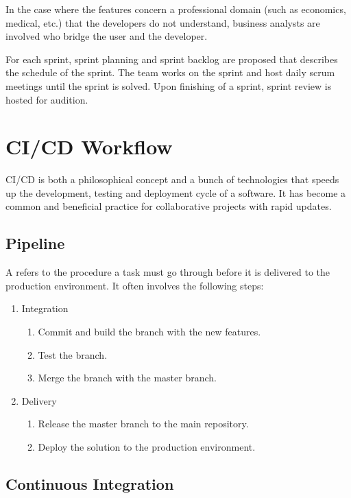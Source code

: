 In the case where the features concern a professional domain (such as economics, medical, etc.) that the developers do not understand, business analysts are involved who bridge the user and the developer.

For each sprint, sprint planning and sprint backlog are proposed that describes the schedule of the sprint. The team works on the sprint and host daily scrum meetings until the sprint is solved. Upon finishing of a sprint, sprint review is hosted for audition.

\section{CI/CD Workflow}

CI/CD is both a philosophical concept and a bunch of technologies that speeds up the development, testing and deployment cycle of a software. It has become a common and beneficial practice for collaborative projects with rapid updates.

\subsection{Pipeline}

A  refers to the procedure a task must go through before it is delivered to the production environment. It often involves the following steps:
\begin{enumerate}
  \item Integration
  \begin{enumerate}
    \item Commit and build the branch with the new features.
    \item Test the branch.
    \item Merge the branch with the master branch.
  \end{enumerate}
  \item Delivery
  \begin{enumerate}
    \item Release the master branch to the main repository.
    \item Deploy the solution to the production environment.
  \end{enumerate}
\end{enumerate}

\subsection{Continuous Integration}

